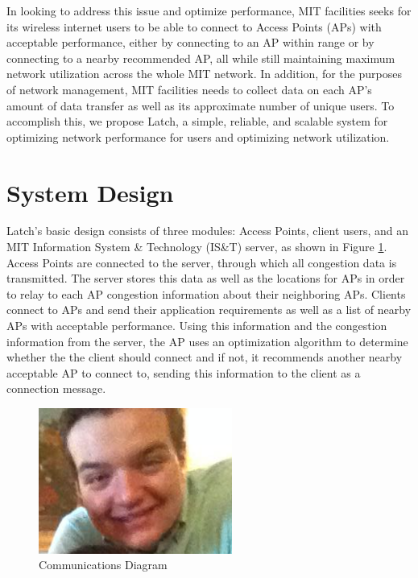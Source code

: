 \documentclass[journal]{IEEEtran}
\begin{document}
In looking to address this issue and optimize performance, MIT facilities seeks for its wireless internet users to be able to connect to Access Points (APs) with acceptable performance, either by connecting to an AP within range or by connecting to a nearby recommended AP, all while still maintaining maximum network utilization across the whole MIT network. In addition, for the purposes of network management, MIT facilities needs to collect data on each AP's amount of data transfer as well as its approximate number of unique users. To accomplish this, we propose Latch, a simple, reliable, and scalable system for optimizing network performance for users and optimizing network utilization.


%
%
\section{System Design}
Latch's basic design consists of three modules: Access Points, client users, and an MIT Information System \& Technology (IS\&T) server, as shown in Figure \ref{comm_diagram}.  Access Points are connected to the server, through which all congestion data is transmitted. The server stores this data as well as the locations for APs in order to relay to each AP congestion information about their neighboring APs. Clients connect to APs and send their application requirements as well as a list of nearby APs with acceptable performance. Using this information and the congestion information from the server, the AP uses an optimization algorithm to determine whether the the client should connect and if not, it recommends another nearby acceptable AP to connect to, sending this information to the client as a connection message.

\begin{figure}[!t]
\centering
\includegraphics[width=2.5in]{john.png}
\caption{Communications Diagram}
\label{comm_diagram}
\end{figure}
\end{document}
